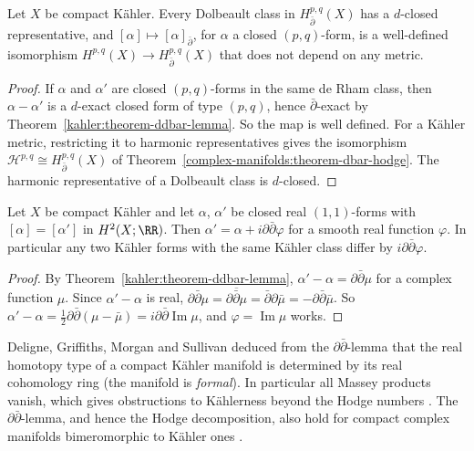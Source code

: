 \begin{corollary}\label{kahler:corollary-canonical-dolbeault}
Let $X$ be compact K\"ahler. Every Dolbeault class in $H^{p,q}_{\bar\partial}(X)$ has a $d$-closed representative, and
$[\alpha] \mapsto [\alpha]_{\bar\partial}$, for $\alpha$ a closed $(p,q)$-form, is a well-defined isomorphism
$H^{p,q}(X) \to H^{p,q}_{\bar\partial}(X)$ that does not depend on any metric.
\end{corollary}

\begin{proof}
If $\alpha$ and $\alpha'$ are closed $(p,q)$-forms in the same de Rham class, then $\alpha - \alpha'$ is a $d$-exact closed form of type
$(p,q)$, hence $\bar\partial$-exact by Theorem~\ref{kahler:theorem-ddbar-lemma}. So the map is well defined. For a K\"ahler
metric, restricting it to harmonic representatives gives the isomorphism
$\mathcal{H}^{p,q} \cong H^{p,q}_{\bar\partial}(X)$ of Theorem~\ref{complex-manifolds:theorem-dbar-hodge}. The harmonic representative of a Dolbeault
class is $d$-closed.
\end{proof}

\begin{corollary}\label{kahler:corollary-ddbar-real}
Let $X$ be compact K\"ahler and let $\alpha$, $\alpha'$ be closed real $(1,1)$-forms with $[\alpha] = [\alpha']$ in $H^2(X; \RR)$. Then
$\alpha' = \alpha + i\partial\bar\partial\varphi$ for a smooth real function $\varphi$. In particular any two K\"ahler forms with the same
K\"ahler class differ by $i\partial\bar\partial\varphi$.
\end{corollary}

\begin{proof}
By Theorem~\ref{kahler:theorem-ddbar-lemma}, $\alpha' - \alpha = \partial\bar\partial\mu$ for a complex function $\mu$. Since
$\alpha' - \alpha$ is real, $\partial\bar\partial\mu = \overline{\partial\bar\partial\mu} = \bar\partial\partial\bar\mu = -\partial\bar\partial\bar\mu$. So
$\alpha' - \alpha = \frac12\partial\bar\partial(\mu - \bar\mu) = i\partial\bar\partial\operatorname{Im}\mu$, and $\varphi = \operatorname{Im}\mu$ works.
\end{proof}

\begin{remark}\label{kahler:remark-formality}
Deligne, Griffiths, Morgan and Sullivan deduced from the $\partial\bar\partial$-lemma that the real homotopy type of a compact K\"ahler
manifold is determined by its real cohomology ring (the manifold is \emph{formal}). In particular all Massey products vanish, which gives
obstructions to K\"ahlerness beyond the Hodge numbers \cite{dgms}. The $\partial\bar\partial$-lemma, and hence the Hodge decomposition, also
hold for compact complex manifolds bimeromorphic to K\"ahler ones \cite{dgms}.
\end{remark}

